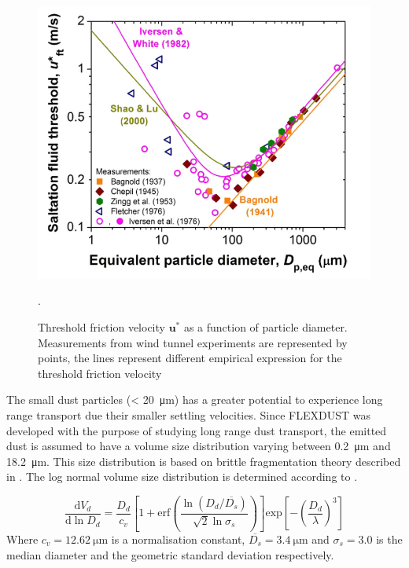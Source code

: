 \begin{figure}[hptb]
    \centering
    \includegraphics[scale=0.7]{../figs/Threshold_friction_velocity.PNG}
    \caption{Threshold friction velocity $\mathbf{u^*}$ as a function of particle diameter. Measurements from wind tunnel experiments are represented by points, the lines represent different empirical expression for the threshold friction velocity \parencite{kok2012physics}}.
    \label{fig:treshold_friction_velocity_ps}
\end{figure}

The small dust particles (< \SI{20}{\micro\metre}) has a greater potential to experience long range transport due their smaller settling velocities. Since FLEXDUST was developed with the purpose of studying long range dust transport, the emitted dust is assumed to have a volume size distribution varying between \SI{0.2}{\micro\metre} and \SI{18.2}{\micro\metre}. This size distribution is based on brittle fragmentation theory described in \textcite{kok_scaling_2011}. The log normal volume size distribution is determined according to . 

\begin{equation}\label{eq:size_dist}
    \frac{\text{d} V_d}{\text{d} \ln D_d} = \frac{D_d}{c_v}\left[1 + \text{erf}\left(\frac{\ln(D_d/\overline{D_s})}{\sqrt{2}\ln \sigma_s}\right)\right]\text{exp}\left[-\left(\frac{D_d}{\lambda}\right)^3\right]
\end{equation}
Where $c_v = \SI{12.62}{\micro\metre}$ is a normalisation constant, $\overline{D_s}=\SI{3.4}{\micro\metre}$ and $\sigma_s = 3.0$ is the median diameter and the geometric standard deviation respectively.  

